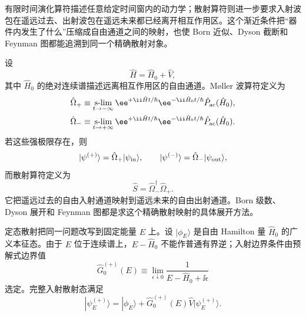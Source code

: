 

有限时间演化算符描述任意给定时间窗内的动力学；散射算符则进一步要求入射波包在遥远过去、出射波包在遥远未来都已经离开相互作用区。这个渐近条件把“器件内发生了什么”压缩成自由通道之间的映射，也使 Born 近似、Dyson 截断和 Feynman 图都能追溯到同一个精确散射对象。

设
\begin{equation}
 \hat H=\hat H_0+\hat V,
 \label{eq:H-scattering-r5}
\end{equation}
其中 $\hat H_0$ 的绝对连续谱描述远离相互作用区的自由通道。M{\o}ller 波算符定义为
\begin{align}
 \hat\Omega_+
 &\equiv
 \operatorname*{s-lim}_{t\to-\infty}
 \ee^{+\ii\hat Ht/\hbar}
 \ee^{-\ii\hat H_0t/\hbar}
 \hat P_{\rm ac}(\hat H_0),\\
 \hat\Omega_-
 &\equiv
 \operatorname*{s-lim}_{t\to+\infty}
 \ee^{+\ii\hat Ht/\hbar}
 \ee^{-\ii\hat H_0t/\hbar}
 \hat P_{\rm ac}(\hat H_0).
 \label{eq:moller-wave-operators-r5}
\end{align}
若这些强极限存在，则
\begin{equation*}
 |\psi^{(+)}\rangle=\hat\Omega_+|\psi_{\rm in}\rangle,
 \qquad
 |\psi^{(-)}\rangle=\hat\Omega_-|\psi_{\rm out}\rangle,
\end{equation*}
而散射算符定义为
\begin{equation}
 \boxed{\hat S=\hat\Omega_-^\dagger\hat\Omega_+.}
 \label{eq:exact-S-waveop-r5}
\end{equation}
它把遥远过去的自由入射通道映射到遥远未来的自由出射通道。Born 级数、Dyson 展开和 Feynman 图都是求这个精确散射映射的具体展开方法。

定态散射把同一问题改写到固定能量 $E$ 上。设 $|\phi_E\rangle$ 是自由 Hamilton 量 $\hat H_0$ 的广义本征态。由于 $E$ 位于连续谱上，$E-\hat H_0$ 不能作普通有界逆；入射边界条件由预解式边界值
\begin{equation}
 \hat G_0^{(+)}(E)
 \equiv\lim_{\epsilon\downarrow0}
 \frac{1}{E-\hat H_0+\ii\epsilon}
 \label{eq:G0-plus-r5}
\end{equation}
选定。完整入射散射态满足
\begin{equation}
 \boxed{
 |\psi_E^{(+)}\rangle
 =
 |\phi_E\rangle
 +\hat G_0^{(+)}(E)\hat V
 |\psi_E^{(+)}\rangle.}
 \label{eq:LS-state-r5}
\end{equation}

